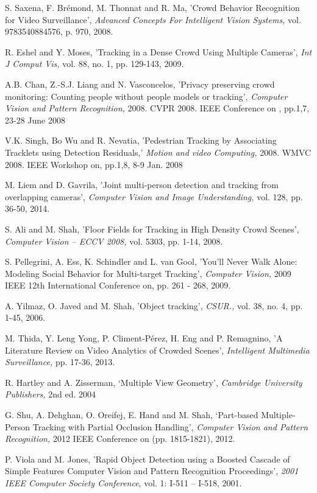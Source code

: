 \documentclass[12pt, twocolumn, conference]{IEEEtran}
\begin{document}
\begin{thebibliography}{1}
S. Saxena, F. Brémond, M. Thonnat and R. Ma, 'Crowd Behavior Recognition for Video Surveillance', \textit{Advanced Concepts For Intelligent Vision Systems,} vol. 9783540884576, p. 970, 2008.

R. Eshel and Y. Moses, 'Tracking in a Dense Crowd Using Multiple Cameras', \textit{Int J Comput Vis,} vol. 88, no. 1, pp. 129-143, 2009.

A.B. Chan, Z.-S.J. Liang and N. Vasconcelos, 'Privacy preserving crowd monitoring: Counting people without people models or tracking', \textit{Computer Vision and Pattern Recognition,} 2008. CVPR 2008. IEEE Conference on , pp.1,7, 23-28 June 2008

V.K. Singh, Bo Wu and R. Nevatia, 'Pedestrian Tracking by Associating Tracklets using Detection Residuals,' \textit{Motion and video Computing,} 2008. WMVC 2008. IEEE Workshop on, pp.1,8, 8-9 Jan. 2008

M. Liem and D. Gavrila, 'Joint multi-person detection and tracking from overlapping cameras', \textit{Computer Vision and Image Understanding,} vol. 128, pp. 36-50, 2014.

S. Ali and M. Shah, 'Floor Fields for Tracking in High Density Crowd Scenes', \textit{Computer Vision – ECCV 2008,} vol. 5303, pp. 1-14, 2008.

S. Pellegrini, A. Ess, K. Schindler and L. van Gool, 'You’ll Never Walk Alone: Modeling Social Behavior for Multi-target Tracking', \textit{Computer Vision,} 2009 IEEE 12th International Conference on, pp. 261 - 268, 2009.

A. Yilmaz, O. Javed and M. Shah, 'Object tracking', \textit{CSUR.,} vol. 38, no. 4, pp. 1-45, 2006.

M. Thida, Y. Leng Yong, P. Climent-Pérez, H. Eng and P. Remagnino, 'A Literature Review on Video Analytics of Crowded Scenes', \textit{Intelligent Multimedia Surveillance,} pp. 17-36, 2013.

R. Hartley and A. Zisserman, ‘Multiple View Geometry’, \textit{Cambridge University Publishers,} 2nd ed. 2004

G. Shu, A. Dehghan, O. Oreifej, E. Hand and M. Shah, ‘Part-based Multiple-Person Tracking with Partial Occlusion Handling’, \textit{Computer Vision and Pattern Recognition,} 2012 IEEE Conference on (pp. 1815-1821), 2012.

P. Viola and M. Jones, 'Rapid Object Detection using a Boosted Cascade of Simple Features Computer Vision and Pattern Recognition Proceedings', \textit{2001 IEEE Computer Society Conference}, vol. 1: I-511 – I-518, 2001.

\end{thebibliography}
 
\end{document}
